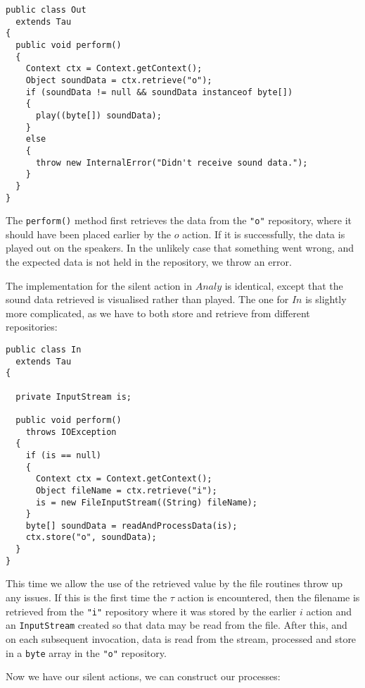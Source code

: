\begin{verbatim}
public class Out
  extends Tau
{
  public void perform()
  {
    Context ctx = Context.getContext();
    Object soundData = ctx.retrieve("o");
    if (soundData != null && soundData instanceof byte[])
    {
      play((byte[]) soundData);
    }
    else
    {
      throw new InternalError("Didn't receive sound data.");
    }
  }
}
\end{verbatim}

The \texttt{perform()} method first retrieves the data from the
\verb!"o"! repository, where it should have been placed earlier by
the $o$ action.  If it is successfully, the data is played out on the
speakers.  In the unlikely case that something went wrong, and the
expected data is not held in the repository, we throw an error.

The implementation for the silent action in $Analy$ is identical,
except that the sound data retrieved is visualised rather than played.
The one for $In$ is slightly more complicated, as we have to both
store and retrieve from different repositories:

\begin{verbatim}
public class In
  extends Tau
{

  private InputStream is;

  public void perform()
    throws IOException
  {
    if (is == null)
    {
      Context ctx = Context.getContext();
      Object fileName = ctx.retrieve("i");
      is = new FileInputStream((String) fileName);
    }
    byte[] soundData = readAndProcessData(is);
    ctx.store("o", soundData);
  }
}
\end{verbatim}

This time we allow the use of the retrieved value by the file routines
throw up any issues.  If this is the first time the $\tau$ action is
encountered, then the filename is retrieved from the \verb!"i"!
repository where it was stored by the earlier $i$ action and an
\texttt{InputStream} created so that data may be read from the file.
After this, and on each subsequent invocation, data is read from the
stream, processed and store in a \texttt{byte} array in the
\verb!"o"! repository.

Now we have our silent actions, we can construct our processes:

